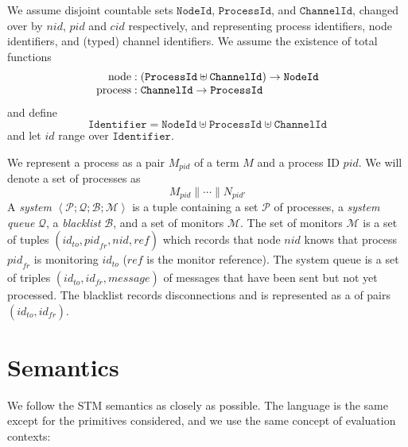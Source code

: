 \documentclass{article}
\DeclareMathOperator{\sNodeOf}{node}
\DeclareMathOperator{\sProcessOf}{process}
\newcommand{\sPar}{\mathrel{\parallel}}
\newcommand{\sProc}[2]{{#1}_{#2}}
\newcommand{\sNid}{\ensuremath{\mathit{nid}}}
\newcommand{\sPid}{\ensuremath{\mathit{pid}}}
\newcommand{\sCid}{\ensuremath{\mathit{cid}}}
\newcommand{\sId}{\ensuremath{\mathit{id}}}
\newcommand{\sRef}{\ensuremath{\mathit{ref}}}
\newcommand{\sSystem}[4]{\left\langle #1 ; #2 ; #3 ; #4 \right\rangle}
\newcommand{\sQueue}{\mathcal{Q}}
\newcommand{\sProcesses}{\mathcal{P}}
\newcommand{\sBlacklist}{\mathcal{B}}
\newcommand{\sMonitors}{\mathcal{M}}
\begin{document}
We assume disjoint countable sets $\mathtt{NodeId}$, $\mathtt{ProcessId}$, and
$\mathtt{ChannelId}$, changed over by \sNid, \sPid{} and \sCid{} respectively,
and representing process identifiers, node identifiers, and (typed) channel
identifiers. We assume the existence of total functions
%
\begin{equation*}
\begin{array}{r@{\;:\;}l}
\sNodeOf    & (\mathtt{ProcessId} \uplus \mathtt{ChannelId}) \rightarrow \mathtt{NodeId} \\
\sProcessOf & \mathtt{ChannelId} \rightarrow \mathtt{ProcessId} 
\end{array}
\end{equation*}
%
and define 
$$\mathtt{Identifier} = \mathtt{NodeId} \uplus \mathtt{ProcessId} \uplus \mathtt{ChannelId}$$ 
and let $\sId$ range over $\mathtt{Identifier}$.

We represent a process as a pair $\sProc{M}{\sPid}$ of a term $M$ and a process
ID $\sPid$. We will denote a set of processes as
%
  $$\sProc{M}{\sPid} \sPar \cdots \sPar \sProc{N}{\sPid'}$$
%
A \emph{system} 
  $\sSystem{\sProcesses}{\sQueue}{\sBlacklist}{\sMonitors}$ 
is a tuple containing a set $\sProcesses$ of processes, a \emph{system
queue} $\sQueue$, a \emph{blacklist} $\sBlacklist$, and a set of monitors
$\sMonitors$.
The set of monitors $\sMonitors$ is a set of tuples 
  $(\sId_\mathit{to}, \sPid_\mathit{fr}, \sNid, \sRef)$ 
which records that node \sNid{} knows that process $\sPid_\mathit{fr}$ is
monitoring $\sId_\mathit{to}$ ($\sRef$ is the monitor reference).  The system
queue is a set of triples $(\sId_\mathit{to}, \sId_\mathit{fr},
\mathit{message})$ of messages that have been sent but not yet processed. The
blacklist records disconnections and is represented as a of pairs
$(\sId_\mathit{to}, \sId_\mathit{fr})$. 

\section{Semantics}

We follow the STM semantics as closely as possible. The language is the same
except for the primitives considered, and we use the same concept of evaluation
contexts:
\end{document}

